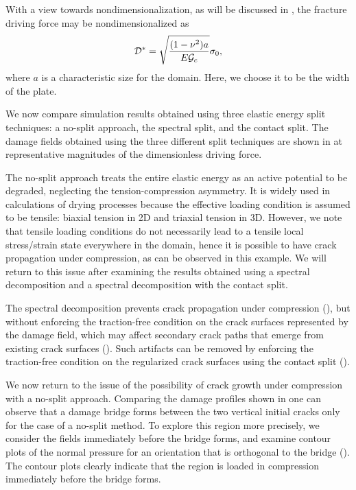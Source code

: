 With a view towards nondimensionalization, as will be discussed in , the fracture driving force may be nondimensionalized as
\begin{align}
  \mathcal{D}^* = \sqrt{\dfrac{(1-\nu^2)a}{E{\mathcal{G}_c}}}\sigma_0,
\end{align}
where $a$ is a characteristic size for the domain.  Here, we choose it to be the width of the plate.



We now compare simulation results obtained using three elastic energy split techniques: a no-split approach, the spectral split, and the contact split. The damage fields obtained using the three different split techniques are shown in  at representative magnitudes of the dimensionless driving force.



The no-split approach treats the entire elastic energy as an active potential to be degraded, neglecting the tension-compression asymmetry. It is widely used in calculations of drying processes because the effective loading condition is assumed to be tensile: biaxial tension in 2D and triaxial tension in 3D. However, we note that tensile loading conditions do not necessarily lead to a tensile local stress/strain state everywhere in the domain, hence it is possible to have crack propagation under compression, as can be observed  in this example.   We will return to this issue after examining the results obtained using a spectral decomposition and a spectral decomposition with the contact split.

The spectral decomposition prevents crack propagation under compression (), but without enforcing the traction-free condition on the crack surfaces represented by the damage field, which may affect secondary crack paths that emerge from existing crack surfaces ().
Such artifacts can be removed by enforcing the traction-free condition on the regularized crack surfaces using the contact split ().



We now return to the issue of the possibility of crack growth under compression with a no-split approach.  Comparing the damage profiles shown in 
one can observe that a damage bridge forms between the two vertical initial cracks only for the case of a no-split method.  To explore this region more precisely, we consider the fields immediately before the bridge forms, and examine contour plots of the normal pressure for an orientation that is orthogonal to the bridge (). The contour plots clearly indicate that the region is loaded in compression immediately before the bridge forms.

